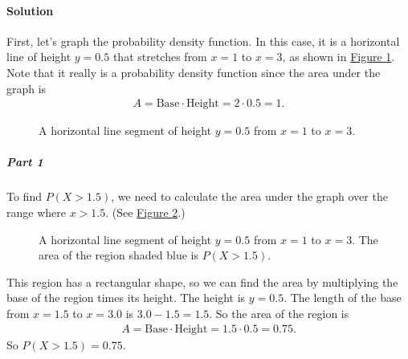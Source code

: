 \documentclass[letterpaper,10pt,english]{jupyterBook}
\begin{document}
\paragraph{Solution}
\label{\detokenize{Ch3 Probability/3.7 Continuous Probability Distributions:id4}}
\sphinxAtStartPar
First, let’s graph the probability density function. In this case, it is a horizontal line of height \(y = 0.5\) that stretches from \(x = 1\) to \(x = 3\), as shown in \hyperref[\detokenize{Ch3 Probability/3.7 Continuous Probability Distributions:pdf-rect2}]{Figure \ref{\detokenize{Ch3 Probability/3.7 Continuous Probability Distributions:pdf-rect2}}}. Note that it really is a probability density function since the area under the graph is
\begin{equation*}
\begin{split} A = \text{Base} \cdot \text{Height} = 2 \cdot 0.5 = 1. \end{split}
\end{equation*}
\begin{figure}[htbp]
\centering
\capstart

\noindent{}
\caption{A horizontal line segment of height \(y = 0.5\) from \(x = 1\) to \(x = 3\).}\label{\detokenize{Ch3 Probability/3.7 Continuous Probability Distributions:pdf-rect2}}\end{figure}


\subparagraph{Part 1}
\label{\detokenize{Ch3 Probability/3.7 Continuous Probability Distributions:part-1}}
\sphinxAtStartPar
To find \(P(X > 1.5)\), we need to calculate the area under the graph over the range where \(x > 1.5\). (See \hyperref[\detokenize{Ch3 Probability/3.7 Continuous Probability Distributions:pdf-rect2-area1}]{Figure \ref{\detokenize{Ch3 Probability/3.7 Continuous Probability Distributions:pdf-rect2-area1}}}.)

\begin{figure}[htbp]
\centering
\capstart

\noindent{}
\caption{A horizontal line segment of height \(y = 0.5\) from \(x = 1\) to \(x = 3\). The area of the region shaded blue is \(P(X > 1.5)\).}\label{\detokenize{Ch3 Probability/3.7 Continuous Probability Distributions:pdf-rect2-area1}}\end{figure}

\sphinxAtStartPar
This region has a rectangular shape, so we can find the area by multiplying the base of the region times its height. The height is \(y = 0.5\). The length of the base from \(x = 1.5\) to \(x = 3.0\) is \(3.0 - 1.5 = 1.5\). So the area of the region is
\begin{equation*}
\begin{split} A = \text{Base} \cdot \text{Height} = 1.5 \cdot 0.5 = 0.75. \end{split}
\end{equation*}
\sphinxAtStartPar
So \(P(X > 1.5) = 0.75\).
\end{document}
